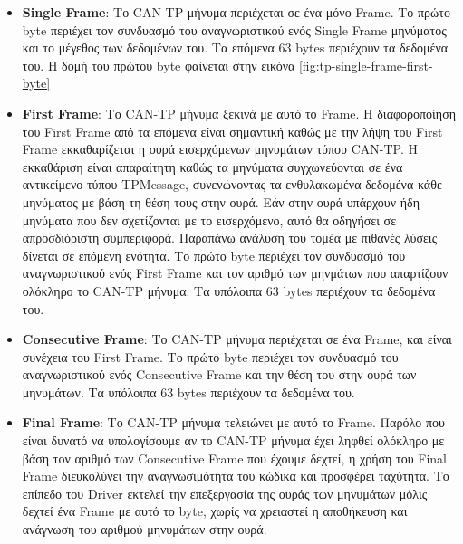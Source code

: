 \documentclass[a4paper,nobib,justified]{tufte-book}
\begin{document}
\begin{itemize}
	\item \textbf{Single Frame}: Το CAN-TP μήνυμα περιέχεται σε ένα μόνο Frame. Το πρώτο byte περιέχει τον συνδυασμό του αναγνωριστικού ενός Single Frame μηνύματος και το μέγεθος των δεδομένων του. Τα επόμενα 63 bytes περιέχουν τα δεδομένα του. Η δομή του πρώτου byte φαίνεται στην εικόνα \ref{fig:tp-single-frame-first-byte}
	\item \textbf{First Frame}: Το CAN-TP μήνυμα ξεκινά με αυτό το Frame. Η διαφοροποίηση του First Frame από τα επόμενα είναι σημαντική καθώς με την λήψη του First Frame εκκαθαρίζεται η ουρά εισερχόμενων μηνυμάτων τύπου CAN-TP. Η εκκαθάριση είναι απαραίτητη καθώς τα μηνύματα συγχωνεύονται σε ένα αντικείμενο τύπου TPMessage, συνενώνοντας τα ενθυλακωμένα δεδομένα κάθε μηνύματος με βάση τη θέση τους στην ουρά. Εάν στην ουρά υπάρχουν ήδη μηνύματα που δεν σχετίζονται με το εισερχόμενο, αυτό θα οδηγήσει σε απροσδιόριστη συμπεριφορά. Παραπάνω ανάλυση του τομέα με πιθανές λύσεις δίνεται σε επόμενη ενότητα. Το πρώτο byte περιέχει τον συνδυασμό του αναγνωριστικού ενός First Frame και τον αριθμό των μηνμάτων που απαρτίζουν ολόκληρο το CAN-TP μήνυμα. Τα υπόλοιπα 63 bytes περιέχουν τα δεδομένα του.
	\item \textbf{Consecutive Frame}: Το CAN-TP μήνυμα περιέχεται σε ένα Frame, και είναι συνέχεια του First Frame. Το πρώτο byte περιέχει τον συνδυασμό του αναγνωριστικού ενός Consecutive Frame και την θέση του στην ουρά των μηνυμάτων. Τα υπόλοιπα 63 bytes περιέχουν τα δεδομένα του.
	\item \textbf{Final Frame}: Το CAN-TP μήνυμα τελειώνει με αυτό το Frame. Παρόλο που είναι δυνατό να υπολογίσουμε αν το CAN-TP μήνυμα έχει ληφθεί ολόκληρο με βάση τον αριθμό των Consecutive Frame που έχουμε δεχτεί, η χρήση του Final Frame διευκολύνει την αναγνωσιμότητα του κώδικα και προσφέρει ταχύτητα. Το επίπεδο του Driver εκτελεί την επεξεργασία της ουράς των μηνυμάτων μόλις δεχτεί ένα Frame με αυτό το byte, χωρίς να χρειαστεί η αποθήκευση και ανάγνωση του αριθμού μηνυμάτων στην ουρά. 
\end{itemize}
\end{document}
